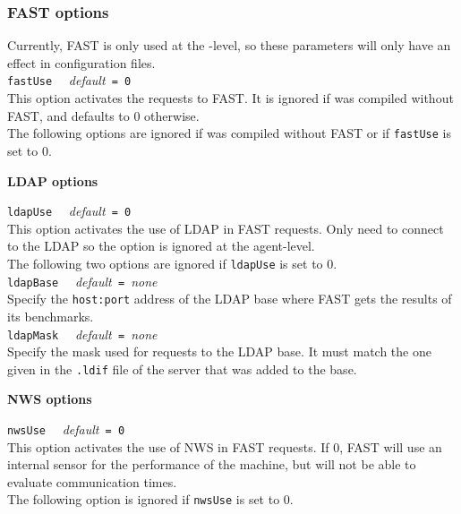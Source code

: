 \subsubsection{FAST options}

\noindent
Currently, FAST is only used at the \sed-level, so these parameters will only
have an effect in \sed configuration files.\\

\noindent
\texttt{fastUse} \ \ \emph{default}\texttt{ = 0}\\ This option activates the
requests to FAST. It is ignored if \diet was compiled without FAST, and
defaults to 0 otherwise.\\

The following options are ignored if \diet was compiled without FAST or if
\texttt{fastUse} is set to 0.

\noindent
\textbf{LDAP options}

\noindent
\texttt{ldapUse} \ \ \emph{default}\texttt{ = 0}\\ This option activates the
use of LDAP in FAST requests.  Only \seds need to connect to the LDAP so the
option is ignored at the agent-level.\\

The following two options are ignored if \texttt{ldapUse} is set to 0.\\

\noindent
\texttt{ldapBase} \ \ \emph{default}\texttt{ = }\emph{none}\\ Specify the
\texttt{host:port} address of the LDAP base where FAST gets the results of its
benchmarks.\\

\noindent
\texttt{ldapMask} \ \ \emph{default}\texttt{ = }\emph{none}\\ Specify the mask
used for requests to the LDAP base. It must match the one given in the
\texttt{.ldif} file of the server that was added to the base.


\noindent
\textbf{NWS options}

\noindent
\texttt{nwsUse} \ \ \emph{default}\texttt{ = 0}\\ This option activates the use
of NWS in FAST requests. If 0, FAST will use an internal sensor for the
performance of the machine, but will not be able to evaluate communication
times.\\

The following option is ignored if \texttt{nwsUse} is set to 0.\\

